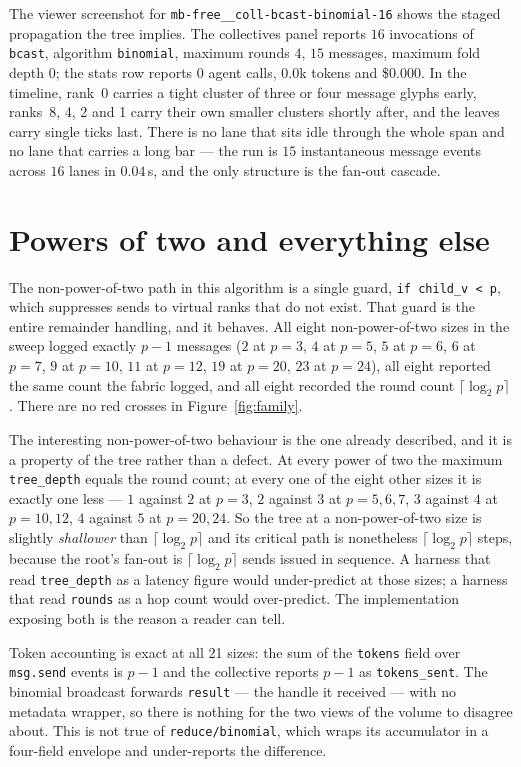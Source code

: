 \documentclass[11pt]{article}
\begin{document}
The viewer screenshot for \texttt{mb-free\_\_coll-bcast-binomial-16} shows the staged
propagation the tree implies. The collectives panel reports $16$ invocations of
\texttt{bcast}, algorithm \texttt{binomial}, maximum rounds $4$, $15$ messages, maximum fold
depth $0$; the stats row reports $0$ agent calls, $0.0$k tokens and \$0.000. In the timeline,
rank~0 carries a tight cluster of three or four message glyphs early, ranks~8, 4, 2 and 1
carry their own smaller clusters shortly after, and the leaves carry single ticks last. There
is no lane that sits idle through the whole span and no lane that carries a long bar --- the
run is $15$ instantaneous message events across $16$ lanes in $0.04$\,s, and the only
structure is the fan-out cascade.

\section{Powers of two and everything else}

The non-power-of-two path in this algorithm is a single guard, \texttt{if child\_v < p}, which
suppresses sends to virtual ranks that do not exist. That guard is the entire remainder
handling, and it behaves. All eight non-power-of-two sizes in the sweep logged exactly $p-1$
messages ($2$ at $p=3$, $4$ at $p=5$, $5$ at $p=6$, $6$ at $p=7$, $9$ at $p=10$, $11$ at
$p=12$, $19$ at $p=20$, $23$ at $p=24$), all eight reported the same count the fabric logged,
and all eight recorded the round count $\lceil\log_2 p\rceil$. There are no red crosses in
Figure~\ref{fig:family}.

The interesting non-power-of-two behaviour is the one already described, and it is a property
of the tree rather than a defect. At every power of two the maximum \texttt{tree\_depth} equals
the round count; at every one of the eight other sizes it is exactly one less --- $1$ against
$2$ at $p=3$, $2$ against $3$ at $p=5,6,7$, $3$ against $4$ at $p=10,12$, $4$ against $5$ at
$p=20,24$. So the tree at a non-power-of-two size is slightly \emph{shallower} than
$\lceil\log_2 p\rceil$ and its critical path is nonetheless $\lceil\log_2 p\rceil$ steps,
because the root's fan-out is $\lceil\log_2 p\rceil$ sends issued in sequence. A harness that
read \texttt{tree\_depth} as a latency figure would under-predict at those sizes; a harness
that read \texttt{rounds} as a hop count would over-predict. The implementation exposing both
is the reason a reader can tell.

Token accounting is exact at all 21 sizes: the sum of the \texttt{tokens} field over
\texttt{msg.send} events is $p-1$ and the collective reports $p-1$ as
\texttt{tokens\_sent}. The binomial broadcast forwards \texttt{result} --- the handle it
received --- with no metadata wrapper, so there is nothing for the two views of the volume to
disagree about. This is not true of \texttt{reduce/binomial}, which wraps its accumulator in
a four-field envelope and under-reports the difference.
\end{document}
